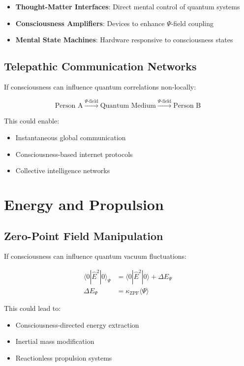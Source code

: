 \documentclass[12pt,article]{memoir}
\begin{document}
\begin{itemize}
    \item \textbf{Thought-Matter Interfaces}: Direct mental control of quantum systems
    \item \textbf{Consciousness Amplifiers}: Devices to enhance $\Psi$-field coupling
    \item \textbf{Mental State Machines}: Hardware responsive to consciousness states
\end{itemize}

\subsection{Telepathic Communication Networks}

If consciousness can influence quantum correlations non-locally:

\begin{equation}
\text{Person A} \xrightarrow{\Psi\text{-field}} \text{Quantum Medium} \xrightarrow{\Psi\text{-field}} \text{Person B}
\end{equation}

This could enable:
\begin{itemize}
    \item Instantaneous global communication
    \item Consciousness-based internet protocols
    \item Collective intelligence networks
\end{itemize}

\section{Energy and Propulsion}

\subsection{Zero-Point Field Manipulation}

If consciousness can influence quantum vacuum fluctuations:

\begin{align}
\langle 0|\hat{E}^2|0\rangle_{\Psi} &= \langle 0|\hat{E}^2|0\rangle + \Delta E_{\Psi} \\
\Delta E_{\Psi} &= \kappa_{\text{ZPF}} \langle\Psi\rangle
\end{align}

This could lead to:
\begin{itemize}
    \item Consciousness-directed energy extraction
    \item Inertial mass modification
    \item Reactionless propulsion systems
\end{itemize}
\end{document}

